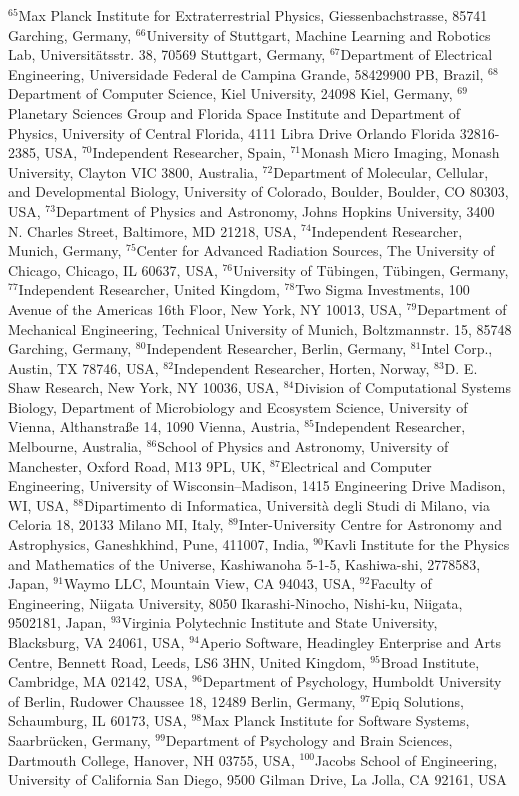 $^{65}$Max Planck Institute for Extraterrestrial Physics, Giessenbachstrasse, 85741 Garching, Germany, 
$^{66}$University of Stuttgart, Machine Learning and Robotics Lab, Universitätsstr. 38, 70569 Stuttgart, Germany, 
$^{67}$Department of Electrical Engineering, Universidade Federal de Campina Grande, 58429900 PB, Brazil, 
$^{68}$Department of Computer Science, Kiel University, 24098 Kiel, Germany, 
$^{69}$Planetary Sciences Group and Florida Space Institute and Department of Physics, University of Central Florida, 4111 Libra Drive Orlando Florida 32816-2385, USA, 
$^{70}$Independent Researcher, Spain, 
$^{71}$Monash Micro Imaging, Monash University, Clayton VIC 3800, Australia, 
$^{72}$Department of Molecular, Cellular, and Developmental Biology, University of Colorado, Boulder, Boulder, CO 80303, USA, 
$^{73}$Department of Physics and Astronomy, Johns Hopkins University, 3400 N. Charles Street, Baltimore, MD 21218, USA, 
$^{74}$Independent Researcher, Munich, Germany, 
$^{75}$Center for Advanced Radiation Sources, The University of Chicago, Chicago, IL 60637, USA, 
$^{76}$University of T\"ubingen, T\"ubingen, Germany, 
$^{77}$Independent Researcher, United Kingdom, 
$^{78}$Two Sigma Investments, 100 Avenue of the Americas 16th Floor, New York, NY 10013, USA, 
$^{79}$Department of Mechanical Engineering, Technical University of Munich, Boltzmannstr. 15, 85748 Garching, Germany, 
$^{80}$Independent Researcher, Berlin, Germany, 
$^{81}$Intel Corp., Austin, TX 78746, USA, 
$^{82}$Independent Researcher, Horten, Norway, 
$^{83}$D. E. Shaw Research, New York, NY 10036, USA, 
$^{84}$Division of Computational Systems Biology, Department of Microbiology and Ecosystem Science, University of Vienna, Althanstra{\ss}e 14, 1090 Vienna, Austria,
$^{85}$Independent Researcher, Melbourne, Australia, 
$^{86}$School of Physics and Astronomy, University of Manchester, Oxford Road, M13 9PL, UK, 
$^{87}$Electrical and Computer Engineering, University of Wisconsin--Madison, 1415 Engineering Drive Madison, WI, USA, 
$^{88}$Dipartimento di Informatica, Universit\`a degli Studi di Milano, via Celoria 18, 20133 Milano MI, Italy, 
$^{89}$Inter-University Centre for Astronomy and Astrophysics, Ganeshkhind, Pune, 411007, India, 
$^{90}$Kavli Institute for the Physics and Mathematics of the Universe, Kashiwanoha 5-1-5, Kashiwa-shi, 2778583, Japan, 
$^{91}$Waymo LLC, Mountain View, CA 94043, USA, 
$^{92}$Faculty of Engineering, Niigata University, 8050 Ikarashi-Ninocho, Nishi-ku, Niigata, 9502181, Japan, 
$^{93}$Virginia Polytechnic Institute and State University, Blacksburg, VA 24061, USA, 
$^{94}$Aperio Software, Headingley Enterprise and Arts Centre, Bennett Road, Leeds, LS6 3HN, United Kingdom, 
$^{95}$Broad Institute, Cambridge, MA 02142, USA, 
$^{96}$Department of Psychology, Humboldt University of Berlin, Rudower Chaussee 18, 12489 Berlin, Germany, 
$^{97}$Epiq Solutions, Schaumburg, IL 60173, USA, 
$^{98}$Max Planck Institute for Software Systems, Saarbr\"ucken, Germany, 
$^{99}$Department of Psychology and Brain Sciences, Dartmouth College, Hanover, NH 03755, USA, 
$^{100}$Jacobs School of Engineering, University of California San Diego, 9500 Gilman Drive, La Jolla, CA 92161, USA